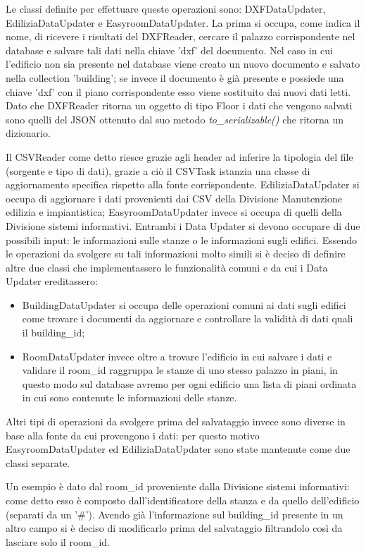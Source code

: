 \documentclass[12pt]{report}
\begin{document}
\vspace{5mm} %

Le classi definite per effettuare queste operazioni sono: DXFDataUpdater, EdiliziaDataUpdater e EasyroomDataUpdater. 
La prima si occupa, come indica il nome, di ricevere i risultati del DXFReader, cercare il palazzo corrispondente nel database e salvare tali dati nella chiave 'dxf' del documento. 
Nel caso in cui l'edificio non sia presente nel database viene creato un nuovo documento e salvato nella collection 'building'; se invece il documento è già presente e possiede una chiave 'dxf' con il piano corrispondente esso viene sostituito dai nuovi dati letti.
Dato che DXFReader ritorna un oggetto di tipo Floor i dati che vengono salvati sono quelli del JSON ottenuto dal suo metodo \textit{to\_serializable()} che ritorna un dizionario. 

Il CSVReader come detto riesce grazie agli header ad inferire la tipologia del file (sorgente e tipo di dati), grazie a ciò il CSVTask istanzia una classe di aggiornamento specifica rispetto alla fonte corrispondente.
EdiliziaDataUpdater si occupa di aggiornare i dati provenienti dai CSV della Divisione Manutenzione edilizia e impiantistica; EasyroomDataUpdater invece si occupa di quelli della Divisione sistemi informativi.
Entrambi i Data Updater si devono occupare di due possibili input: le informazioni sulle stanze o le informazioni sugli edifici.
Essendo le operazioni da svolgere su tali informazioni molto simili si è deciso di definire altre due classi che implementassero le funzionalità comuni e da cui i Data Updater ereditassero:
\begin{itemize}
\item BuildingDataUpdater si occupa delle operazioni comuni ai dati sugli edifici come trovare i documenti da aggiornare e controllare la validità di dati quali il building\_id;
\item RoomDataUpdater invece oltre a trovare l'edificio in cui salvare i dati e validare il room\_id raggruppa le stanze di uno stesso palazzo in piani, in questo modo sul database avremo per ogni edificio una lista di piani ordinata in cui sono contenute le informazioni delle stanze.
\end{itemize}
Altri tipi di operazioni da svolgere prima del salvataggio invece sono diverse in base alla fonte da cui provengono i dati: per questo motivo EasyroomDataUpdater ed EdiliziaDataUpdater sono state mantenute come due classi separate.

Un esempio è dato dal room\_id proveniente dalla Divisione sistemi informativi: come detto esso è composto dall'identificatore della stanza e da quello dell'edificio (separati da un '\#'). Avendo già l'informazione sul building\_id presente in un altro campo si è deciso di modificarlo prima del salvataggio filtrandolo così da lasciare solo il room\_id.
\end{document}
